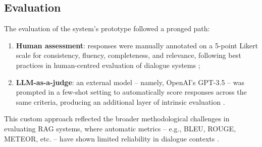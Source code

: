 \begin{spacing}{1.5}
\subsection{Evaluation}
The evaluation of the system's prototype followed a pronged path:
\begin{enumerate}
      \item \textbf{Human assessment}: responses were manually annotated on a 5-point Likert scale for consistency, fluency, completeness, and relevance, following best practices in human-centred evaluation of dialogue systems \citep{abeysinghe_challenges_2024,van_der_lee_human_2021};
      \item \textbf{LLM-as-a-judge}: an external model -- namely, OpenAI’s GPT-3.5 -- was prompted in a few-shot setting to automatically score responses across the same criteria, producing an additional layer of intrinsic evaluation \citep{svikhnushina_approximating_2023}.
\end{enumerate}

This custom approach reflected the broader methodological challenges in evaluating RAG systems, where automatic metrics -- e.g., BLEU, ROUGE, METEOR, etc. -- have shown limited reliability in dialogue contexts \citep{deriu_survey_2020,liu_how_2016}.


\end{spacing}
